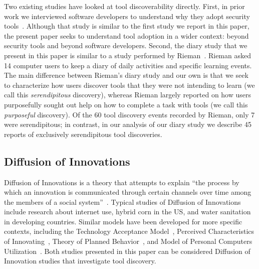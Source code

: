 \documentclass[smallextended]{svjour3}
\begin{document}
\noindent
Two existing studies have looked at tool discoverability directly.
First, in prior work we interviewed software developers to 
understand why they adopt security tools~\cite{xiao}.
Although that study is similar to the first study we report in this paper, 
the present paper seeks to understand
tool adoption in a wider context: beyond security tools and beyond software developers.
Second, the diary study that we present in this paper is similar to 
a study performed by Rieman~\cite{rieman}.
Rieman asked 14 computer users to keep a diary of
daily activities and specific learning events.
The main difference between Rieman's diary study and our
own is that we seek to characterize how users discover tools
that they were not intending to learn (we call this \emph{serendipitous} discovery), 
whereas Rieman largely reported on how users purposefully sought out help
on how to complete a task with tools (we call this \emph{purposeful} discovery).
Of the 60 tool discovery events recorded by Rieman, 
only 7 were serendipitous; in contrast, in our analysis of our diary
study we describe 45 reports of exclusively serendipitous tool discoveries.

\subsection{Diffusion of Innovations}

\noindent Diffusion of Innovations is a theory that attempts to explain ``the
process by which an innovation is communicated through certain channels over
time among the members of a social system''~\cite{rogers03}.
Typical studies of Diffusion of Innovations include research about internet use,
hybrid corn in the US, and water sanitation in developing countries.
Similar models have been developed for more specific contexts, including 
the Technology Acceptance Model~\cite{DAVI89,VENK00}, Perceived
Characteristics of Innovating~\cite{MOOR91}, Theory of Planned
Behavior~\cite{AJZE91}, and Model of Personal Computers
Utilization~\cite{THOM91}.
Both studies presented in this paper can be considered Diffusion of Innovation
studies that investigate tool discovery.
\end{document}
